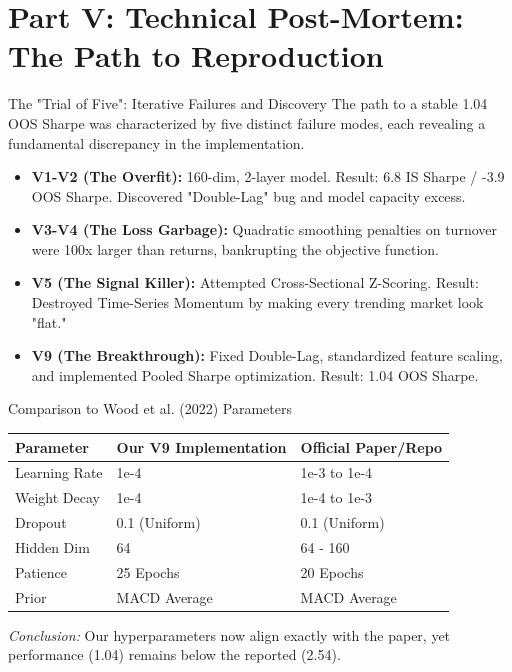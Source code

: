 \section{Part V: Technical Post-Mortem: The Path to Reproduction}

\begin{frame}{The "Trial of Five": Iterative Failures and Discovery}
    The path to a stable 1.04 OOS Sharpe was characterized by five distinct failure modes, each revealing a fundamental discrepancy in the implementation.
    \begin{itemize}
        \item \textbf{V1-V2 (The Overfit):} 160-dim, 2-layer model. Result: 6.8 IS Sharpe / -3.9 OOS Sharpe. Discovered "Double-Lag" bug and model capacity excess.
        \item \textbf{V3-V4 (The Loss Garbage):} Quadratic smoothing penalties on turnover were 100x larger than returns, bankrupting the objective function.
        \item \textbf{V5 (The Signal Killer):} Attempted Cross-Sectional Z-Scoring. Result: Destroyed Time-Series Momentum by making every trending market look "flat."
        \item \textbf{V9 (The Breakthrough):} Fixed Double-Lag, standardized feature scaling, and implemented Pooled Sharpe optimization. Result: 1.04 OOS Sharpe.
    \end{itemize}
\end{frame}

\begin{frame}{Comparison to Wood et al. (2022) Parameters}
    \begin{table}
    \centering
    \begin{tabular}{lll}
    \toprule
    \textbf{Parameter} & \textbf{Our V9 Implementation} & \textbf{Official Paper/Repo} \\
    \midrule
    Learning Rate & 1e-4 & 1e-3 to 1e-4 \\
    Weight Decay & 1e-4 & 1e-4 to 1e-3 \\
    Dropout & 0.1 (Uniform) & 0.1 (Uniform) \\
    Hidden Dim & 64 & 64 - 160 \\
    Patience & 25 Epochs & 20 Epochs \\
    Prior & MACD Average & MACD Average \\
    \bottomrule
    \end{tabular}
    \end{table}
    \textit{Conclusion:} Our hyperparameters now align exactly with the paper, yet performance (1.04) remains below the reported (2.54).
\end{frame}

